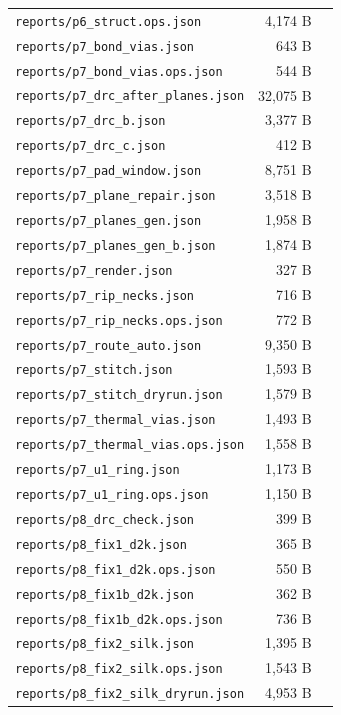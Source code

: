 \documentclass[11pt,a4paper]{article}
\begin{document}
{\begin{longtable}{p{9cm}rp{4cm}}
\texttt{reports/p6\_struct.ops.json} & 4,174 B &  \\
\texttt{reports/p7\_bond\_vias.json} & 643 B &  \\
\texttt{reports/p7\_bond\_vias.ops.json} & 544 B &  \\
\texttt{reports/p7\_drc\_after\_planes.json} & 32,075 B &  \\
\texttt{reports/p7\_drc\_b.json} & 3,377 B &  \\
\texttt{reports/p7\_drc\_c.json} & 412 B &  \\
\texttt{reports/p7\_pad\_window.json} & 8,751 B &  \\
\texttt{reports/p7\_plane\_repair.json} & 3,518 B &  \\
\texttt{reports/p7\_planes\_gen.json} & 1,958 B &  \\
\texttt{reports/p7\_planes\_gen\_b.json} & 1,874 B &  \\
\texttt{reports/p7\_render.json} & 327 B &  \\
\texttt{reports/p7\_rip\_necks.json} & 716 B &  \\
\texttt{reports/p7\_rip\_necks.ops.json} & 772 B &  \\
\texttt{reports/p7\_route\_auto.json} & 9,350 B &  \\
\texttt{reports/p7\_stitch.json} & 1,593 B &  \\
\texttt{reports/p7\_stitch\_dryrun.json} & 1,579 B &  \\
\texttt{reports/p7\_thermal\_vias.json} & 1,493 B &  \\
\texttt{reports/p7\_thermal\_vias.ops.json} & 1,558 B &  \\
\texttt{reports/p7\_u1\_ring.json} & 1,173 B &  \\
\texttt{reports/p7\_u1\_ring.ops.json} & 1,150 B &  \\
\texttt{reports/p8\_drc\_check.json} & 399 B &  \\
\texttt{reports/p8\_fix1\_d2k.json} & 365 B &  \\
\texttt{reports/p8\_fix1\_d2k.ops.json} & 550 B &  \\
\texttt{reports/p8\_fix1b\_d2k.json} & 362 B &  \\
\texttt{reports/p8\_fix1b\_d2k.ops.json} & 736 B &  \\
\texttt{reports/p8\_fix2\_silk.json} & 1,395 B &  \\
\texttt{reports/p8\_fix2\_silk.ops.json} & 1,543 B &  \\
\texttt{reports/p8\_fix2\_silk\_dryrun.json} & 4,953 B &  \\

\end{longtable}}
\end{document}
